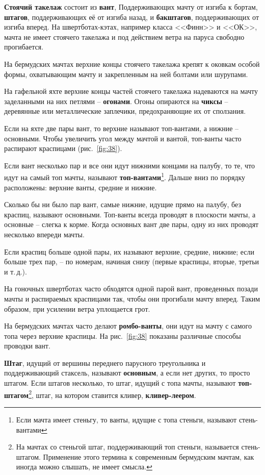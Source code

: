 \documentclass[a4paper, 12pt, twoside, final]{scrbook}
\begin{document}
\textbf{Стоячий такелаж} состоит из \textbf{вант}, Поддерживающих
мачту от изгиба к бортам, \textbf{штагов}, поддерживающих её от изгиба
назад, и \textbf{бакштагов}, поддерживающих от изгиба вперед. На швертботах-кэтах,
например класса <<Финн>> и <<ОК>>, мачта не имеет стоячего такелажа и
под действием ветра на паруса свободно прогибается.

На бермудских мачтах верхние концы стоячего такелажа крепят к оковкам
особой формы, охватывающим мачту и закрепленным на ней болтами или
шурупами.

На гафельной яхте верхние концы частей стоячего такелажа надеваются
на мачту заделанными на них петлями \--- \textbf{огонами}. Огоны опираются
на \textbf{чиксы} \--- деревянные или металлические заплечики, предохраняющие
их от сползания.

Если на яхте две пары вант, то верхние называют топ-вантами, а нижние \---
основными. Чтобы увеличить угол между мачтой и вантой, топ-ванты часто
распирают краспицами (рис.~\ref{fig:38}).

Если вант несколько пар и все они идут нижними концами на палубу,
то те, что идут на самый топ мачты, называют \textbf{топ-вантами}\footnote{Если мачта имеет стеньгу, то ванты, идущие с топа стеньги, называют
стень-вантами}. Дальше вниз по порядку расположены: верхние ванты, средние и нижние.

Сколько бы ни было пар вант, самые нижние, идущие прямо на палубу,
без краспиц, называют основными. Топ-ванты всегда проводят в плоскости
мачты, а основные \--- слегка к корме. Когда основных вант две пары,
одну из них проводят несколько впереди мачты.

Если краспиц больше одной пары, их называют верхние, средние, нижние;
если больше трех пар, \--- по номерам, начиная снизу (первые краспицы,
вторые, третьи и т.\,д.).

На гоночных швертботах часто обходятся одной парой вант, проведенных
позади мачты и распираемых краспицами так, чтобы они прогибали мачту
вперед. Таким образом, при усилении ветра уплощается грот.

На бермудских мачтах часто делают \textbf{ромбо-ванты}, они идут на
мачту с самого топа через верхние краспицы. На рис.~\ref{fig:38} показаны различные
способы проводки вант.

\textbf{Штаг}, идущий от вершины переднего парусного треугольника
и поддерживающий стаксель, называют \textbf{основным}, а если нет
других, то просто штагом. Если штагов несколько, то штаг, идущий с
топа мачты, называют \textbf{топ-штагом}\footnote{На мачтах со стеньгой штаг, поддерживающий топ стеньги, называется
стень-штагом. Применение этого термина к современным бермудским мачтам,
как иногда можно слышать, не имеет смысла.}, штаг, на котором ставится кливер, \textbf{кливер-леером}.
\end{document}
